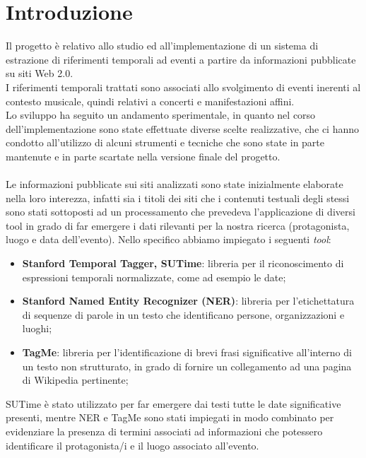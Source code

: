 \documentclass[a4paper]{report}
\begin{document}
\chapter{Introduzione}
Il progetto\cite{0} è relativo allo studio ed all'implementazione di un sistema di estrazione di riferimenti temporali ad eventi a partire da informazioni pubblicate su siti Web 2.0. \\
I riferimenti temporali trattati sono associati allo svolgimento di eventi inerenti al contesto musicale, quindi relativi a concerti e manifestazioni affini. \\
Lo sviluppo ha seguito un andamento sperimentale, in quanto nel corso dell'implementazione sono state effettuate diverse scelte realizzative, che ci hanno condotto all'utilizzo di alcuni strumenti e tecniche che sono state in parte mantenute e in parte scartate nella versione finale del progetto. \\ 
\\
Le informazioni pubblicate sui siti analizzati sono state inizialmente elaborate nella loro interezza, infatti sia i titoli dei siti che i contenuti testuali degli stessi sono stati sottoposti ad un processamento che prevedeva l'applicazione di diversi tool in grado di far emergere i dati rilevanti per la nostra ricerca (protagonista, luogo e data dell'evento). Nello specifico abbiamo impiegato i seguenti \textit{tool}:
\begin{itemize}
\item \textbf{Stanford Temporal Tagger, SUTime}\cite{1}: libreria per il riconoscimento di espressioni temporali normalizzate, come ad esempio le date;
\item \textbf{Stanford Named Entity Recognizer (NER)}\cite{2}:  libreria per l'etichettatura di sequenze di parole in un testo che identificano persone, organizzazioni e luoghi;
\item \textbf{TagMe}\cite{3}: libreria per l'identificazione di brevi frasi significative all'interno di un testo non strutturato, in grado di fornire un collegamento ad una pagina di Wikipedia pertinente;
\end{itemize}
SUTime è stato utilizzato per far emergere dai testi tutte le date significative presenti, mentre NER e TagMe sono stati impiegati in modo combinato per evidenziare la presenza di termini associati ad informazioni che potessero identificare il protagonista/i e il luogo associato all'evento.
\end{document}
